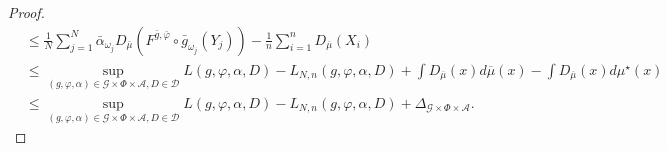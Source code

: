 \documentclass[10pt]{article}
\begin{document}
\begin{proof}
\begin{align*}
   &\leq  \frac{1}{N} \sum_{j=1}^N \bar{\alpha}_{\omega_j} D_{\bar{\mu}}(F^{\bar{g},\bar{\varphi}}\circ \bar{g}_{\omega_j}(Y_j))-\frac{1}{n}\sum_{i=1}^n D_{\overline{\mu}}(X_i)  \\
    & \leq   \sup_{(g,\varphi,\alpha)\in \mathcal{G}\times  \Phi\times \mathcal{A},D\in \mathcal{D}} L(g,\varphi,\alpha,D)-L_{N,n}(g,\varphi,\alpha,D)   +  \int D_{\overline{\mu}}(x)d\overline{\mu}(x)-\int D_{\overline{\mu}}(x)d\mu^\star(x)   \\
    & \leq  \sup_{(g,\varphi,\alpha)\in \mathcal{G}\times  \Phi\times \mathcal{A},D\in \mathcal{D}} L(g,\varphi,\alpha,D)-L_{N,n}(g,\varphi,\alpha,D)   + \Delta_{\mathcal{G}\times \Phi \times \mathcal{A}}  .
\end{align*}
\end{proof}
\end{document}
